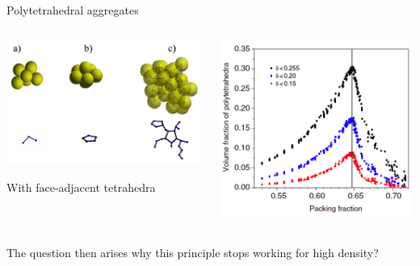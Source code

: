 \documentclass{bredelebeamer}
\begin{document}
\begin{frame}{Polytetrahedral aggregates}
\begin{columns}
\begin{column}{0.5\textwidth}
\includegraphics[scale=0.2]{images/pp5.png}
\centerline{With face-adjacent tetrahedra}
\end{column}

\begin{column}{0.5\textwidth}
\includegraphics[scale=0.2]{images/pp6.png}
\end{column}
\end{columns}
The question then arises why this principle stops working for high density?
\end{frame}
\end{document}
